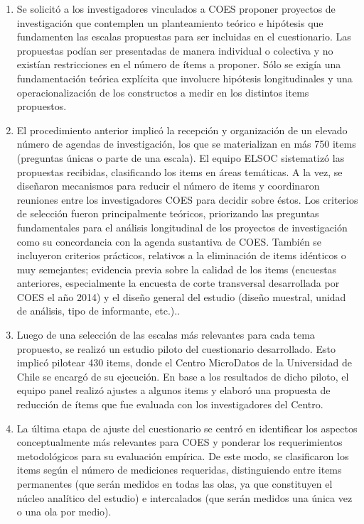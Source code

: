\documentclass[
  12pt,
]{article}
\begin{document}
\begin{enumerate}
\def\labelenumi{\arabic{enumi}.}
\item
  Se solicitó a los investigadores vinculados a COES proponer proyectos de investigación que contemplen un planteamiento teórico e hipótesis que fundamenten las escalas propuestas para ser incluidas en el cuestionario. Las propuestas podían ser presentadas de manera individual o colectiva y no existían restricciones en el número de ítems a proponer. Sólo se exigía una fundamentación teórica explícita que involucre hipótesis longitudinales y una operacionalización de los constructos a medir en los distintos items propuestos.
\item
  El procedimiento anterior implicó la recepción y organización de un elevado número de agendas de investigación, los que se materializan en más 750 items (preguntas únicas o parte de una escala). El equipo ELSOC sistematizó las propuestas recibidas, clasificando los items en áreas temáticas. A la vez, se diseñaron mecanismos para reducir el número de items y coordinaron reuniones entre los investigadores COES para decidir sobre éstos. Los criterios de selección fueron principalmente teóricos, priorizando las preguntas fundamentales para el análisis longitudinal de los proyectos de investigación como su concordancia con la agenda sustantiva de COES. También se incluyeron criterios prácticos, relativos a la eliminación de items idénticos o muy semejantes; evidencia previa sobre la calidad de los items (encuestas anteriores, especialmente la encuesta de corte transversal desarrollada por COES el año 2014) y el diseño general del estudio (diseño muestral, unidad de análisis, tipo de informante, etc.)..
\item
  Luego de una selección de las escalas más relevantes para cada tema propuesto, se realizó un estudio piloto del cuestionario desarrollado. Esto implicó pilotear 430 items, donde el Centro MicroDatos de la Universidad de Chile se encargó de su ejecución. En base a los resultados de dicho piloto, el equipo panel realizó ajustes a algunos items y elaboró una propuesta de reducción de ítems que fue evaluada con los investigadores del Centro.
\item
  La última etapa de ajuste del cuestionario se centró en identificar los aspectos conceptualmente más relevantes para COES y ponderar los requerimientos metodológicos para su evaluación empírica. De este modo, se clasificaron los items según el número de mediciones requeridas, distinguiendo entre items permanentes (que serán medidos en todas las olas, ya que constituyen el núcleo analítico del estudio) e intercalados (que serán medidos una única vez o una ola por medio).
\end{enumerate}
\end{document}
